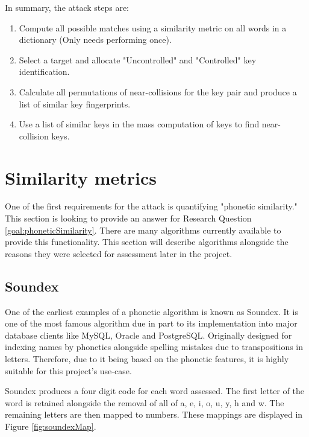 In summary, the attack steps are:

\begin{enumerate}
    \item Compute all possible matches using a similarity metric on all words in a dictionary (Only needs performing once).

    \item Select a target and allocate "Uncontrolled" and "Controlled" key identification.
    
    \item Calculate all permutations of near-collisions for the key pair and produce a list of similar key fingerprints.
    
    \item Use a list of similar keys in the mass computation of keys to find near-collision keys.

\end{enumerate}

\section{Similarity metrics}
\label{sec:metrics}
One of the first requirements for the attack is quantifying "phonetic similarity." This section is looking to provide an answer for Research Question \ref{goal:phoneticSimilarity}. There are many algorithms currently available to provide this functionality. This section will describe algorithms alongside the reasons they were selected for assessment later in the project.

\subsection{Soundex}
One of the earliest examples of a phonetic algorithm is known as Soundex. It is one of the most famous algorithm due in part to its implementation into major database clients like MySQL\cite{mysql_soundex}, Oracle\cite{moved_2005} and PostgreSQL\cite{postgresql}. Originally designed for indexing names by phonetics alongside spelling mistakes due to transpositions in letters. Therefore, due to it being based on the phonetic features, it is highly suitable for this project's use-case. 

Soundex produces a four digit code for each word assessed.
The first letter of the word is retained alongside the removal of all of a, e, i, o, u, y, h and w. The remaining letters are then mapped to numbers. These mappings are displayed in Figure \ref{fig:soundexMap}.

